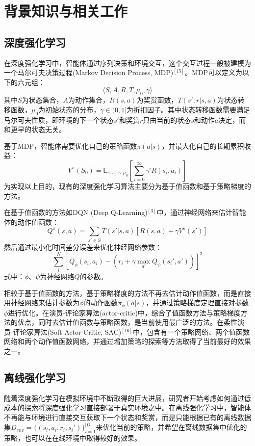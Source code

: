 \documentclass{article}
\begin{document}
\section{背景知识与相关工作}
\subsection{深度强化学习}
在深度强化学习中，智能体通过序列决策和环境交互，这个交互过程一般被建模为一个马尔可夫决策过程(Markov Decision Process, MDP)$^{[15]}$。MDP可以定义为以下的六元组：
\[
  \langle S, A, R, T, \mu_0, \gamma \rangle
\]
其中$S$为状态集合，$A$为动作集合，$R(s, a)$为奖赏函数，$T(s', r | s, a)$为状态转移函数，$\mu_0$为初始状态的分布，$\gamma \in (0,1]$为折扣因子。其中状态转移函数需要满足马尔可夫性质，即环境的下一个状态$s'$和奖赏$r$只由当前的状态$s$和动作$a$决定，而和更早的状态无关。

基于MDP，智能体需要优化自己的策略函数$\pi(a | s)$，并最大化自己的长期累积收益：
\[
  V^{\pi}(S_0) = \mathbb{E}_{\pi, s_0 \sim \mu_0}\left[ \sum_{i=0}^{\infty} \gamma^i R(s_i, a_i) \right]
\]
为实现以上目的，现有的深度强化学习算法主要分为基于值函数和基于策略梯度的方法。

在基于值函数的方法如DQN (Deep Q-Learning)$^{[3]}$中，通过神经网络来估计智能体的动作值函数：
\[
  Q^{\pi}(s, a) = \sum_{s' \in S} T(s' | s, a) \left[ R(s, a) + \gamma V^{\pi}(s') \right]
\]
然后通过最小化时间差分误差来优化神经网络参数：
\[
  \sum_{i}^{N}\left[Q_{\phi}(s_i, a_i)-\left(r_i+\gamma \max_{a'} Q_{\psi}\left(s_i', a'\right)\right)\right]^{2} \tag{1}
\]
式中：$\phi、\psi$为神经网络$Q$的参数。

相较于基于值函数的方法，基于策略梯度的方法不再去估计动作值函数，而是直接用神经网络来估计参数为$\phi$的动作函数$\pi_{\phi}(a | s)$，并通过策略梯度定理直接对参数$\phi$进行优化。在演员-评论家算法(actor-critic)中，综合了值函数方法与策略梯度方法的优点，同时去估计值函数与策略函数，是当前使用最广泛的方法。在柔性演员-评论家算法(Soft Actor-Critic, SAC)$^{[16]}$中，包含有一个策略网络、两个值函数网络和两个动作值函数网络，并通过增加策略的探索等方法取得了当前最好的效果之一。

\subsection{离线强化学习}
随着深度强化学习在模拟环境中不断取得的巨大进展，研究者开始考虑如何通过低成本的探索将深度强化学习直接部署于真实环境之中。在离线强化学习中，智能体不再能与环境进行直接交互获取下一个状态和奖赏，而是只能根据已有的离线数据集$D_{env} = \{(s_i, a_i, r_i, s_i')\}_{i=1}^{|D|}$来优化当前的策略，并希望在离线数据集中优化的策略，也可以在在线环境中取得较好的效果。
\end{document}
